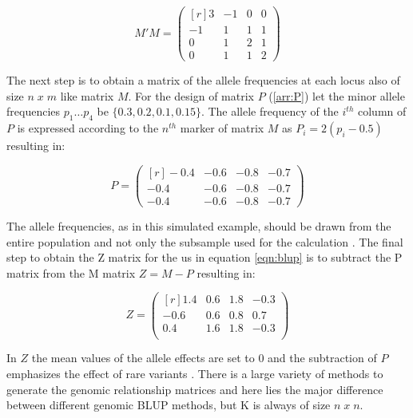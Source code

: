 \begin{equation}
 M'M = 
 \begin{pmatrix}[r]
  3 & -1 & 0 & 0 \\
  -1 & 1 & 1 & 1 \\
  0 & 1 & 2 & 1 \\
  0 & 1 & 1 & 2 
 \end{pmatrix}
 \label{arr:M'M}
\end{equation}

The next step is to obtain a matrix of the allele frequencies at each locus also of size
$n\; x\; m$ like matrix $M$. For the design of matrix $P$ (\ref{arr:P}) let the minor
allele frequencies $p_1 \dots p_4$ be $\{0.3, 0.2, 0.1, 0.15\}$. The allele frequency of
the $i^{th}$ column of $P$ is expressed according to the $n^{th}$ marker of matrix $M$ as
$P_i = 2(p_i - 0.5)$ resulting in:

\begin{equation}
 P = 
 \begin{pmatrix}[r]
  -0.4 & -0.6 & -0.8 & -0.7 \\
  -0.4 & -0.6 & -0.8 & -0.7 \\
  -0.4 & -0.6 & -0.8 & -0.7
 \end{pmatrix}
 \label{arr:P}
\end{equation}

The allele frequencies, as in this simulated example, should be drawn from the entire
population and not only the subsample used for the calculation
\cite{vanraden2008efficient}. The final step to obtain the Z matrix for the us in equation
\ref{eqn:blup} is to subtract the P matrix from the M matrix $Z= M - P$ resulting in:

\begin{equation}
 Z = 
 \begin{pmatrix}[r]
  1.4 & 0.6 & 1.8 & -0.3 \\
  -0.6 & 0.6 & 0.8 & 0.7 \\
  0.4 & 1.6 & 1.8 & -0.3 \\
 \end{pmatrix}
 \label{arr:Z}
\end{equation}

In $Z$ the mean values of the allele effects are set to 0 and the subtraction of $P$
emphasizes the effect of rare variants \cite{vanraden2008efficient}. There is a large
variety of methods to generate the genomic relationship matrices and here lies the major
difference between different genomic BLUP methods, but K is always of size $n\;x\;n$.

